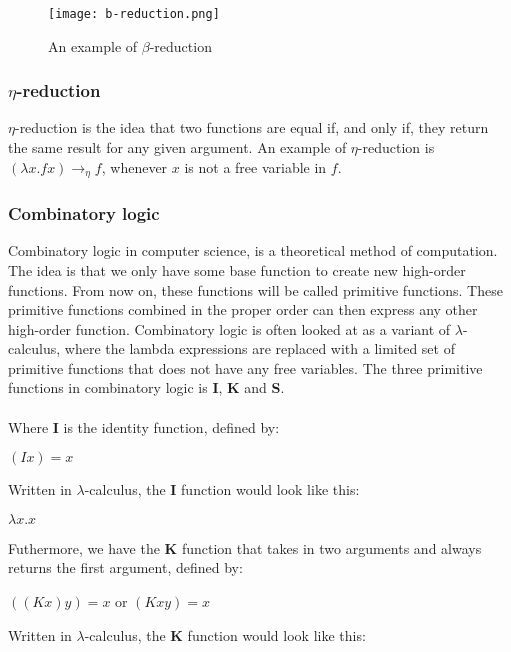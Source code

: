 \begin{figure}
    \centering
    \texttt{[image: b-reduction.png]}
    \caption{An example of $\beta$-reduction}
    \label{fig:beta-reduction}
\end{figure}

\subsubsection{$\eta$-reduction}
$\eta$-reduction is the idea that two functions are equal if, and only if, they return the same result for any given argument. An example of $\eta$-reduction is $(\lambda x.f x)  \rightarrow_\eta f$, whenever $x$ is not a free variable in $f$.

\subsubsection{Combinatory logic}
\label{combinatory logic}
Combinatory logic in computer science, is a theoretical method of computation. The idea is that we only have some base function to create new high-order functions. From now on, these functions will be called primitive functions. These primitive functions combined in the proper order can then express any other high-order function. Combinatory logic is often looked at as a variant of $\lambda$-calculus, where the lambda expressions are replaced with a limited set of primitive functions that does not have any free variables. 
The three primitive functions in combinatory logic is \textbf{I}, \textbf{K} and \textbf{S}.
\\ \\
Where \textbf{I} is the identity function, defined by: \\ 
\begin{center}
    $(I x) = x$\\    
\end{center}
Written in $\lambda$-calculus, the \textbf{I} function would look like this:\\
\begin{center}
    $\lambda x.x$\\    
\end{center}
Futhermore, we have the \textbf{K} function that takes in two arguments and always returns the first argument, defined by:
\begin{center}
    $ ((K x) y) = x$ or $(K x y) = x$\\    
\end{center}
Written in $\lambda$-calculus, the \textbf{K} function would look like this:\\
